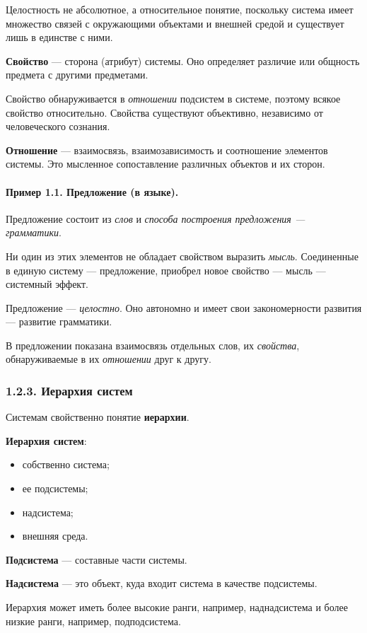 \documentclass[11pt,a4paper]{article}
\begin{document}
Целостность не абсолютное, а относительное понятие, поскольку система имеет
множество связей с окружающими объектами и внешней средой и существует лишь в
единстве с ними.

\textbf{Свойство} — сторона (атрибут) системы. Оно определяет различие или
общность предмета с другими предметами.

Свойство обнаруживается в \emph{отношении} подсистем в системе, поэтому всякое
свойство относительно. Свойства существуют объективно, независимо от
человеческого сознания.

\textbf{Отношение} — взаимосвязь, взаимозависимость и соотношение элементов
системы. Это мысленное сопоставление различных объектов и их сторон.

\paragraph{Пример 1.1. Предложение (в языке).}
Предложение состоит из \emph{слов} и \emph{способа построения предложения —
  грамматики}. 

Ни один из этих элементов не обладает свойством выразить \emph{мысль}.
Соединенные в единую систему — предложение, приобрел новое свойство — мысль —
системный эффект.

Предложение — \emph{целостно}. Оно автономно и имеет свои закономерности
развития — развитие грамматики.

В предложении показана взаимосвязь отдельных слов, их \emph{свойства},
обнаруживаемые в их \emph{отношении} друг к другу.

\subsubsection*{1.2.3. Иерархия систем}

Системам свойственно понятие \textbf{иерархии}. 

\textbf{Иерархия систем}:
\begin{itemize}[noitemsep]
\item собственно система;
\item ее подсистемы;
\item надсистема;
\item внешняя среда.
\end{itemize}
\textbf{Подсистема} — составные части системы.

\textbf{Надсистема} — это объект, куда входит система в качестве подсистемы.

Иерархия может иметь более высокие ранги, например, наднадсистема и более
низкие ранги, например, подподсистема.
\end{document}
